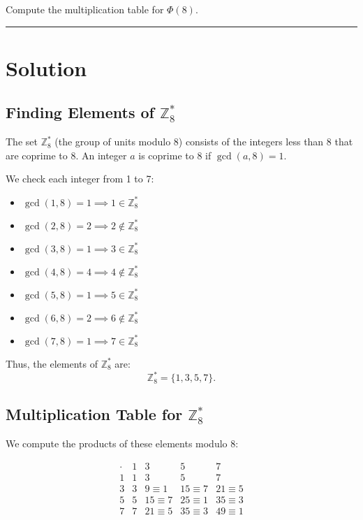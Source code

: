 \documentclass[12pt]{amsart}
\theoremstyle{definition}
\numberwithin{equation}{section}
\begin{document}
\begin{exercise}{4} 
Compute the multiplication table for \(\Phi(8)\).

\noindent\rule{\linewidth}{1pt}

\section*{Solution}

\subsection*{Finding Elements of \(\mathbb{Z}_8^*\)}

The set \(\mathbb{Z}_8^*\) (the group of units modulo 8) consists of the integers less than 8 that are coprime to 8. An integer \(a\) is coprime to 8 if \(\gcd(a, 8) = 1\).

We check each integer from 1 to 7:
\begin{itemize}
    \item \( \gcd(1, 8) = 1 \implies 1 \in \mathbb{Z}_8^*\)
    \item \( \gcd(2, 8) = 2 \implies 2 \not\in \mathbb{Z}_8^*\)
    \item \( \gcd(3, 8) = 1 \implies 3 \in \mathbb{Z}_8^*\)
    \item \( \gcd(4, 8) = 4 \implies 4 \not\in \mathbb{Z}_8^*\)
    \item \( \gcd(5, 8) = 1 \implies 5 \in \mathbb{Z}_8^*\)
    \item \( \gcd(6, 8) = 2 \implies 6 \not\in \mathbb{Z}_8^*\)
    \item \( \gcd(7, 8) = 1 \implies 7 \in \mathbb{Z}_8^*\)
\end{itemize}

Thus, the elements of \(\mathbb{Z}_8^*\) are:
\[
\mathbb{Z}_8^* = \{1, 3, 5, 7\}.
\]

\subsection*{Multiplication Table for \(\mathbb{Z}_8^*\)}

We compute the products of these elements modulo 8:

\[
\begin{array}{c|cccc}
  \cdot & 1 & 3 & 5 & 7 \\
  \hline
  1 & 1 & 3 & 5 & 7 \\
  3 & 3 & 9 \equiv 1 & 15 \equiv 7 & 21 \equiv 5 \\
  5 & 5 & 15 \equiv 7 & 25 \equiv 1 & 35 \equiv 3 \\
  7 & 7 & 21 \equiv 5 & 35 \equiv 3 & 49 \equiv 1 \\
\end{array}
\]


\end{exercise}
\end{document}
